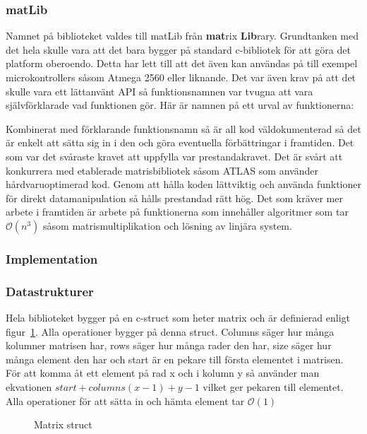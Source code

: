 \subsubsection{matLib}
Namnet på biblioteket valdes till matLib från \textbf{mat}rix \textbf{Lib}rary. Grundtanken med det hela skulle vara att det bara bygger på standard c-bibliotek för att göra det platform oberoendo. Detta har lett till att det även kan användas på till exempel microkontrollers såsom Atmega 2560 eller liknande.
Det var även krav på att det skulle vara ett lättanvänt API så funktionsnamnen var tvugna att vara självförklarade vad funktionen gör. Här är namnen på ett urval av funktionerna:

Kombinerat med förklarande funktionsnamn så är all kod väldokumenterad så det är enkelt att sätta sig in i den och göra eventuella förbättringar i framtiden.
\newline
\newline
Det som var det svåraste kravet att uppfylla var prestandakravet. Det är svårt att konkurrera med etablerade matrisbibliotek såsom ATLAS som använder hårdvaruoptimerad kod. Genom att hålla koden lättviktig och använda funktioner för direkt datamanipulation så hålls prestandad rätt hög. Det som kräver mer arbete i framtiden är arbete på funktionerna som innehåller algoritmer som tar $\mathcal{O}(n^3)$ såsom matrismultiplikation och lösning av linjära system.


\subsubsection{Implementation}


\subsubsection{Datastrukturer}
Hela biblioteket bygger på en c-struct som heter matrix och är definierad enligt figur~\ref{fig:matrix_struct}. Alla operationer bygger på denna struct. Columns säger hur många kolumner matrisen har, rows säger hur många rader den har, size säger hur många element den har och start är en pekare till första elementet i matrisen. För att komma åt ett element på rad x och i kolumn y så använder man ekvationen $start+columns(x-1)+y-1$ vilket ger pekaren till elementet. Alla operationer för att sätta in och hämta element tar $\mathcal{O}(1)$
\begin{figure}[H]

\caption{Matrix struct}
\label{fig:matrix_struct}
\end{figure}


